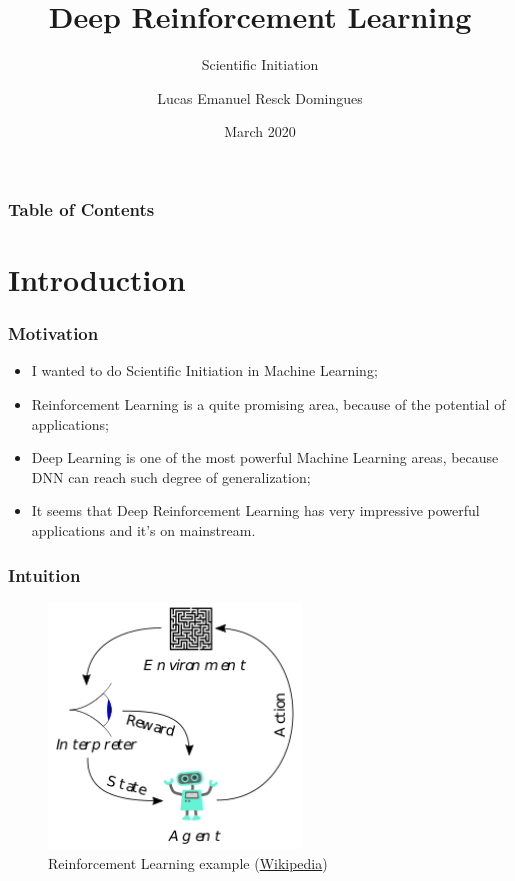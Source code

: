\documentclass{beamer}
\title[Deep Reinforcement Learning]{Deep Reinforcement Learning}
\subtitle{Scientific Initiation}
\author[Resck]{Lucas Emanuel Resck Domingues}
\institute[FGV]
{
  Escola de Matemática Aplicada \\
  Fundação Getulio Vargas
}
\date[2020]
{March 2020}
\begin{document}
    \frame{\titlepage}

    \begin{frame}
        \frametitle{Table of Contents}
        \tableofcontents
    \end{frame}

    \section{Introduction}

        \begin{frame}
            \frametitle{Motivation}

            \begin{itemize}
                \item I wanted to do Scientific Initiation in Machine Learning;
                \item Reinforcement Learning is a quite promising area, because of the potential of applications;
                \item Deep Learning is one of the most powerful Machine Learning areas, because DNN can reach such degree of generalization;
                \item It seems that Deep Reinforcement Learning has very impressive powerful applications and it's on mainstream.
            \end{itemize}

        \end{frame}

        \begin{frame}
            \frametitle{Intuition}

            \begin{figure}
                \centering
                \includegraphics[width=0.6\textwidth]{figures/rl.png}
                \caption{Reinforcement Learning example (\href{https://en.wikipedia.org/wiki/Reinforcement_learning}{Wikipedia})}
                \label{fig14:rl}
            \end{figure}

        \end{frame}
\end{document}
